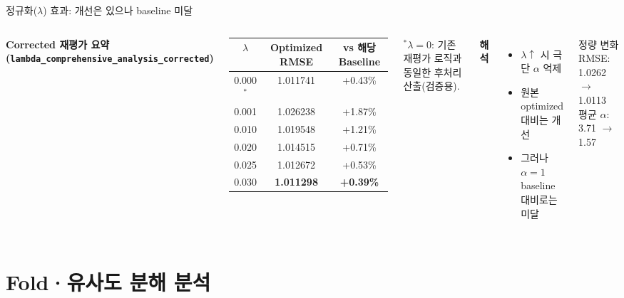 \documentclass[aspectratio=169,10pt]{beamer}
\begin{document}
\begin{frame}{정규화(\(\lambda\)) 효과: 개선은 있으나 baseline 미달}
	\begin{columns}[T]
			\textbf{Corrected 재평가 요약 (\texttt{lambda\_comprehensive\_analysis\_corrected})}
			\vspace{0.2em}
			\renewcommand{\arraystretch}{1.25}
			\begin{tabular}{c|c|c}
				\toprule
				\(\lambda\) & Optimized RMSE & vs 해당 Baseline \\
				\midrule
				0.000$^{*}$ & 1.011741 & +0.43\% \\
				0.001 & 1.026238 & +1.87\% \\
				0.010 & 1.019548 & +1.21\% \\
				0.020 & 1.014515 & +0.71\% \\
				0.025 & 1.012672 & +0.53\% \\
				0.030 & \textbf{1.011298} & \textbf{+0.39\%} \\
				\bottomrule
			\end{tabular}

			{\tiny $^{*}$\(\lambda=0\): 기존 재평가 로직과 동일한 후처리 산출(검증용).}

			\textbf{해석}
			\begin{itemize}
				\item \(\lambda\uparrow\) 시 극단 \(\alpha\) 억제
				\item 원본 optimized 대비는 개선
				\item 그러나 \(\alpha=1\) baseline 대비로는 미달
			\end{itemize}

			\begin{block}{정량 변화}
				RMSE: 1.0262 \(\rightarrow\) 1.0113\\
				평균 \(\alpha\): 3.71 \(\rightarrow\) 1.57
			\end{block}
	\end{columns}
\end{frame}

\section{Fold·유사도 분해 분석}
\end{document}
